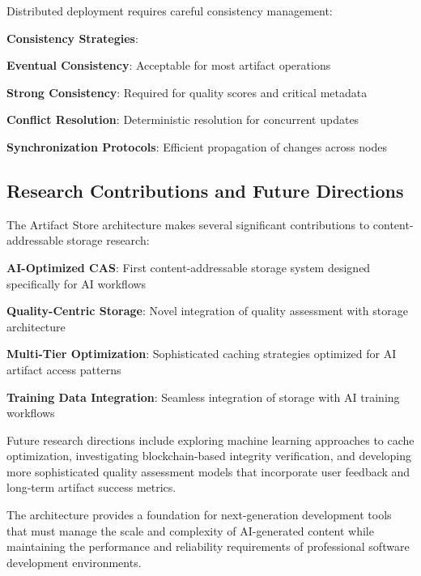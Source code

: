 Distributed deployment requires careful consistency management:

\begin{successbox}
\textbf{Consistency Strategies}:
\begin{compactlist}
    \item \textbf{Eventual Consistency}: Acceptable for most artifact operations
    \item \textbf{Strong Consistency}: Required for quality scores and critical metadata
    \item \textbf{Conflict Resolution}: Deterministic resolution for concurrent updates
    \item \textbf{Synchronization Protocols}: Efficient propagation of changes across nodes
\end{compactlist}
\end{successbox}

\subsection*{Research Contributions and Future Directions}

The Artifact Store architecture makes several significant contributions to content-addressable storage research:

\begin{expandedlist}
    \item \textbf{AI-Optimized CAS}: First content-addressable storage system designed specifically for AI workflows
    \item \textbf{Quality-Centric Storage}: Novel integration of quality assessment with storage architecture
    \item \textbf{Multi-Tier Optimization}: Sophisticated caching strategies optimized for AI artifact access patterns
    \item \textbf{Training Data Integration}: Seamless integration of storage with AI training workflows
\end{expandedlist}

Future research directions include exploring machine learning approaches to cache optimization, investigating blockchain-based integrity verification, and developing more sophisticated quality assessment models that incorporate user feedback and long-term artifact success metrics.

The architecture provides a foundation for next-generation development tools that must manage the scale and complexity of AI-generated content while maintaining the performance and reliability requirements of professional software development environments.
